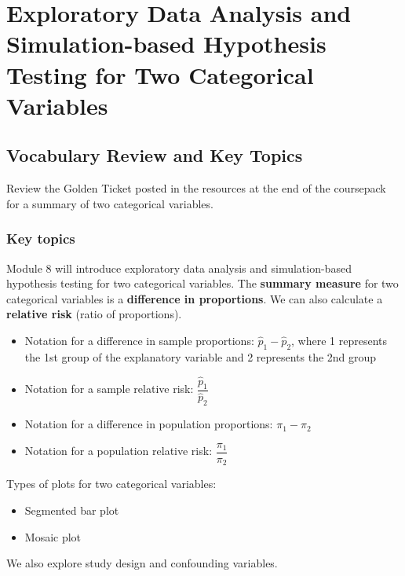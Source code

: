 \documentclass[
]{report}
\begin{document}
\newpage

\chapter{Exploratory Data Analysis and Simulation-based Hypothesis Testing for Two Categorical Variables}\label{exploratory-data-analysis-and-simulation-based-hypothesis-testing-for-two-categorical-variables}

\section{Vocabulary Review and Key Topics}\label{vocabulary-review-and-key-topics-6}

Review the Golden Ticket posted in the resources at the end of the coursepack for a summary of two categorical variables.

\subsection{Key topics}\label{key-topics-7}

Module 8 will introduce exploratory data analysis and simulation-based hypothesis testing for two categorical variables. The \textbf{summary measure} for two categorical variables is a \textbf{difference in proportions}. We can also calculate a \textbf{relative risk} (ratio of proportions).

\begin{itemize}
\item
  Notation for a difference in sample proportions: \(\hat{p}_1 - \hat{p}_2\), where 1 represents the 1st group of the explanatory variable and 2 represents the 2nd group
\item
  Notation for a sample relative risk: \(\dfrac{\hat{p}_1}{\hat{p}_2}\)
\item
  Notation for a difference in population proportions: \(\pi_1 - \pi_2\)
\item
  Notation for a population relative risk: \(\dfrac{\pi_1}{\pi_2}\)
\end{itemize}

Types of plots for two categorical variables:

\begin{itemize}
\item
  Segmented bar plot
\item
  Mosaic plot
\end{itemize}

We also explore study design and confounding variables.
\end{document}
